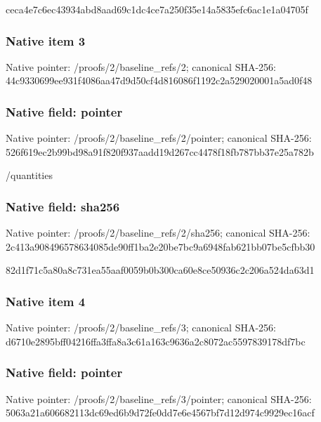 \documentclass[10pt,a4paper]{article}
\begin{document}
ceca4e7c6ec43934abd8aad6\allowbreak{}9c1dc4ce7a250f35e14a5835\allowbreak{}efc6ac1e1a04705f


\subsubsection{Native item 3}


Native pointer: /proofs/2/baseline\_refs/2; canonical SHA-256: 44c9330699ee931f4086aa47\allowbreak{}d9d50cf4d816086f1192c2a5\allowbreak{}29020001a5ad0f48



\subsubsection{Native field: pointer}


Native pointer: /proofs/2/baseline\_refs/2/pointer; canonical SHA-256: 526f619ec2b99bd98a91f820\allowbreak{}f937aadd19d267cc4478f18f\allowbreak{}b787bb37e25a782b


/quantities


\subsubsection{Native field: sha256}


Native pointer: /proofs/2/baseline\_refs/2/sha256; canonical SHA-256: 2c413a908496578634085de9\allowbreak{}0ff1ba2e20be7bc9a6948fab\allowbreak{}621bb07be5cfbb30


82d1f71c5a80a8c731ea55aa\allowbreak{}f0059b0b300ca60e8ce50936\allowbreak{}c2c206a524da63d1


\subsubsection{Native item 4}


Native pointer: /proofs/2/baseline\_refs/3; canonical SHA-256: d6710e2895bff04216ffa3ff\allowbreak{}a8a3c61a163c9636a2c8072a\allowbreak{}c5597839178df7bc



\subsubsection{Native field: pointer}


Native pointer: /proofs/2/baseline\_refs/3/pointer; canonical SHA-256: 5063a21a606682113dc69ed6\allowbreak{}b9d72fe0dd7e6e4567bf7d12\allowbreak{}d974c9929ec16acf
\end{document}
